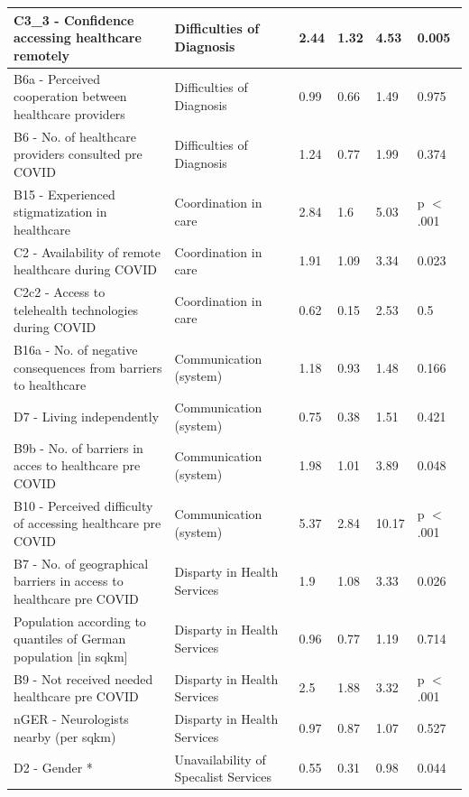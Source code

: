 \documentclass{bmcart}
\begin{document}
\begin{backmatter}
\begin{table}[!ht]
\begin{tabular}{|p{5cm} | p{2cm} |l|l|l|l|}
C3\_3 - Confidence accessing healthcare remotely & Difficulties of Diagnosis & 2.44 & 1.32 & 4.53 & 0.005 \\ \hline
B6a - Perceived cooperation between healthcare providers & Difficulties of Diagnosis & 0.99 & 0.66 & 1.49 & 0.975 \\ \hline
B6 - No. of healthcare providers consulted pre COVID & Difficulties of Diagnosis & 1.24 & 0.77 & 1.99 & 0.374 \\ \hline
B15 - Experienced stigmatization in healthcare & Coordination in care & 2.84 & 1.6 & 5.03 & p $<$ .001 \\ \hline
C2 - Availability of remote healthcare during COVID & Coordination in care & 1.91 & 1.09 & 3.34 & 0.023 \\ \hline
C2c2 - Access to telehealth technologies during COVID & Coordination in care & 0.62 & 0.15 & 2.53 & 0.5 \\ \hline
B16a - No. of negative consequences from barriers to healthcare & Communication (system) & 1.18 & 0.93 & 1.48 & 0.166 \\ \hline
D7 - Living independently & Communication (system) & 0.75 & 0.38 & 1.51 & 0.421 \\ \hline
B9b - No. of barriers in acces to healthcare pre COVID & Communication (system) & 1.98 & 1.01 & 3.89 & 0.048 \\ \hline
B10 - Perceived difficulty of accessing healthcare pre COVID & Communication (system) & 5.37 & 2.84 & 10.17 & p $<$ .001 \\ \hline
B7 - No. of geographical barriers in access to healthcare pre COVID & Disparty in Health Services & 1.9 & 1.08 & 3.33 & 0.026 \\ \hline
Population according to quantiles of German population [in sqkm] & Disparty in Health Services & 0.96 & 0.77 & 1.19 & 0.714 \\ \hline
B9 - Not received needed healthcare pre COVID & Disparty in Health Services & 2.5 & 1.88 & 3.32 & p $<$ .001 \\ \hline
nGER - Neurologists nearby (per sqkm) & Disparty in Health Services & 0.97 & 0.87 & 1.07 & 0.527 \\ \hline
D2 - Gender * & Unavailability of Specalist Services & 0.55 & 0.31 & 0.98 & 0.044 \\ \hline
\end{tabular}
\end{table}

\end{backmatter}
\end{document}
